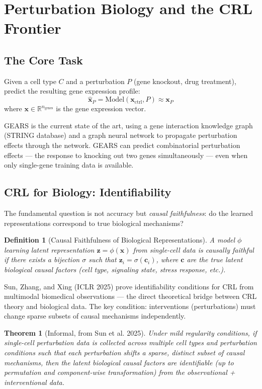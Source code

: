 \documentclass[11pt]{article}
\newtheorem{theorem}{Theorem}
\newtheorem{definition}{Definition}
\begin{document}
\section{Perturbation Biology and the CRL Frontier}

\subsection{The Core Task}

Given a cell type $C$ and a perturbation $P$ (gene knockout, drug treatment), predict the resulting gene expression profile:
$$\hat{\mathbf{x}}_P = \text{Model}(\mathbf{x}_{\text{ctrl}}, P) \approx \mathbf{x}_{P}$$
where $\mathbf{x} \in \mathbb{R}^{n_{\text{genes}}}$ is the gene expression vector.

GEARS \citep{roohani2023gears} is the current state of the art, using a gene interaction knowledge graph (STRING database) and a graph neural network to propagate perturbation effects through the network. GEARS can predict combinatorial perturbation effects --- the response to knocking out two genes simultaneously --- even when only single-gene training data is available.

\subsection{CRL for Biology: Identifiability}

The fundamental question is not accuracy but \emph{causal faithfulness}: do the learned representations correspond to true biological mechanisms?

\begin{definition}[Causal Faithfulness of Biological Representations]
A model $\phi$ learning latent representation $\mathbf{z} = \phi(\mathbf{x})$ from single-cell data is causally faithful if there exists a bijection $\sigma$ such that $\mathbf{z}_i = \sigma(\mathbf{c}_i)$, where $\mathbf{c}$ are the true latent biological causal factors (cell type, signaling state, stress response, etc.).
\end{definition}

Sun, Zhang, and Xing \citep{sun2025crl} (ICLR 2025) prove identifiability conditions for CRL from multimodal biomedical observations --- the direct theoretical bridge between CRL theory and biological data. The key condition: interventions (perturbations) must change sparse subsets of causal mechanisms independently.

\begin{theorem}[Informal, from Sun et al. 2025]
Under mild regularity conditions, if single-cell perturbation data is collected across multiple cell types and perturbation conditions such that each perturbation shifts a sparse, distinct subset of causal mechanisms, then the latent biological causal factors are identifiable (up to permutation and component-wise transformation) from the observational + interventional data.
\end{theorem}
\end{document}
